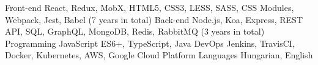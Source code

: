 

\begin{cvskills}

  \cvskill
    {Front-end} %
    {React, Redux, MobX, HTML5, CSS3, LESS, SASS, CSS Modules, Webpack, Jest, Babel (7 years in total)} %
  \cvskill
    {Back-end} %
    {Node.js, Koa, Express, REST API, SQL, GraphQL, MongoDB, Redis, RabbitMQ (3 years in total)} %
  \cvskill
    {Programming} %
    {JavaScript ES6+, TypeScript, Java} %
  \cvskill
    {DevOps} %
    {Jenkins, TravisCI, Docker, Kubernetes, AWS, Google Cloud Platform} %
  \cvskill
    {Languages} %
    {Hungarian, English} %

\end{cvskills}
